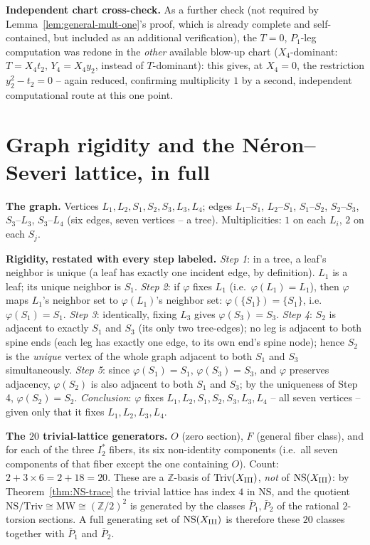 \documentclass[11pt]{amsart}
\theoremstyle{definition}
\newcommand{\Z}{\mathbb{Z}}
\newcommand{\Triv}{\mathrm{Triv}}
\newcommand{\NS}{\mathrm{NS}}
\begin{document}
\textbf{Independent chart cross-check.} As a further check (not required
by Lemma~\ref{lem:general-mult-one}'s proof, which is already complete
and self-contained, but included as an additional verification), the
$T=0$, $P_1$-leg computation was redone in the \emph{other} available
blow-up chart ($X_4$-dominant: $T=X_4t_2,\,Y_4=X_4y_2$, instead of
$T$-dominant): this gives, at $X_4=0$, the restriction $y_2^2-t_2=0$ --
again reduced, confirming multiplicity $1$ by a second, independent
computational route at this one point.

\section{Graph rigidity and the N\'eron--Severi lattice, in full}
\label{app:D}

\textbf{The graph.} Vertices $L_1,L_2,S_1,S_2,S_3,L_3,L_4$; edges
$L_1$--$S_1$, $L_2$--$S_1$, $S_1$--$S_2$, $S_2$--$S_3$, $S_3$--$L_3$,
$S_3$--$L_4$ (six edges, seven vertices -- a tree). Multiplicities: $1$
on each $L_i$, $2$ on each $S_j$.

\textbf{Rigidity, restated with every step labeled.}
\emph{Step 1}: in a tree, a leaf's neighbor is unique (a leaf has exactly
one incident edge, by definition). $L_1$ is a leaf; its unique neighbor
is $S_1$.
\emph{Step 2}: if $\varphi$ fixes $L_1$ (i.e.\ $\varphi(L_1)=L_1$), then
$\varphi$ maps $L_1$'s neighbor set to $\varphi(L_1)$'s neighbor set:
$\varphi(\{S_1\})=\{S_1\}$, i.e.\ $\varphi(S_1)=S_1$.
\emph{Step 3}: identically, fixing $L_3$ gives $\varphi(S_3)=S_3$.
\emph{Step 4}: $S_2$ is adjacent to exactly $S_1$ and $S_3$ (its only two
tree-edges); no leg is adjacent to both spine ends (each leg has exactly
one edge, to its own end's spine node); hence $S_2$ is the \emph{unique}
vertex of the whole graph adjacent to both $S_1$ and $S_3$ simultaneously.
\emph{Step 5}: since $\varphi(S_1)=S_1$, $\varphi(S_3)=S_3$, and $\varphi$
preserves adjacency, $\varphi(S_2)$ is also adjacent to both $S_1$ and
$S_3$; by the uniqueness of Step 4, $\varphi(S_2)=S_2$.
\emph{Conclusion}: $\varphi$ fixes $L_1,L_2,S_1,S_2,S_3,L_3,L_4$ -- all
seven vertices -- given only that it fixes $L_1,L_2,L_3,L_4$.

\textbf{The $20$ trivial-lattice generators.} $O$ (zero section), $F$
(general fiber class), and for each of the three $I_2^*$ fibers, its six
non-identity components (i.e.\ all seven components of that fiber except
the one containing $O$). Count: $2+3\times6=2+18=20$. These are a
$\Z$-basis of $\Triv(X_{\rm III})$, \emph{not} of
$\NS(X_{\rm III})$: by Theorem~\ref{thm:NS-trace} the trivial lattice has
index $4$ in $\NS$, and the quotient
$\NS/\Triv\cong\mathrm{MW}\cong(\Z/2)^2$ is generated by the classes
$\bar P_1,\bar P_2$ of the rational $2$-torsion sections. A full
generating set of $\NS(X_{\rm III})$ is therefore these $20$ classes
together with $\bar P_1$ and $\bar P_2$.
\end{document}
